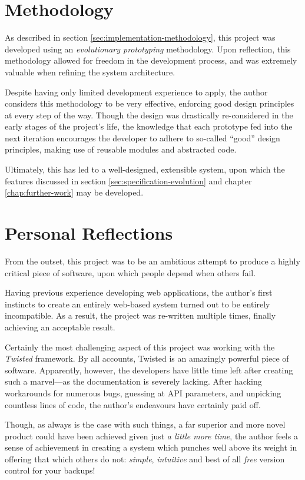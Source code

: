 \section{Methodology}

As described in section \ref{sec:implementation-methodology}, this project was
developed using an \emph{evolutionary prototyping} methodology. Upon
reflection, this methodology allowed for freedom in the development process,
and was extremely valuable when refining the system architecture.

Despite having only limited development experience to apply, the author
considers this methodology to be very effective, enforcing good design
principles at every step of the way. Though the design was drastically
re-considered in the early stages of the project's life, the knowledge that
each prototype fed into the next iteration encourages the developer to adhere
to so-called ``good'' design principles, making use of reusable modules and
abstracted code.

Ultimately, this has led to a well-designed, extensible system, upon which the
features discussed in section \ref{sec:specification-evolution} and chapter
\ref{chap:further-work} may be developed.

\section{Personal Reflections}

From the outset, this project was to be an ambitious attempt to produce
a highly critical piece of software, upon which people depend when others fail.

Having previous experience developing web applications, the author's first
instincts to create an entirely web-based system turned out to be entirely
incompatible. As a result, the project was re-written multiple times, finally
achieving an acceptable result.

Certainly the most challenging aspect of this project was working with the
\emph{Twisted} framework. By all accounts, Twisted is an amazingly powerful
piece of software. Apparently, however, the developers have little time left
after creating such a marvel---as the documentation is severely lacking. After
hacking workarounds for numerous bugs, guessing at API parameters, and
unpicking countless lines of code, the author's endeavours have certainly paid
off.

Though, as always is the case with such things, a far superior and more novel
product could have been achieved given just \emph{a little more time}, the
author feels a sense of achievement in creating a system which punches well
above its weight in offering that which others do not: \emph{simple},
\emph{intuitive} and best of all \emph{free} version control for your backups!
